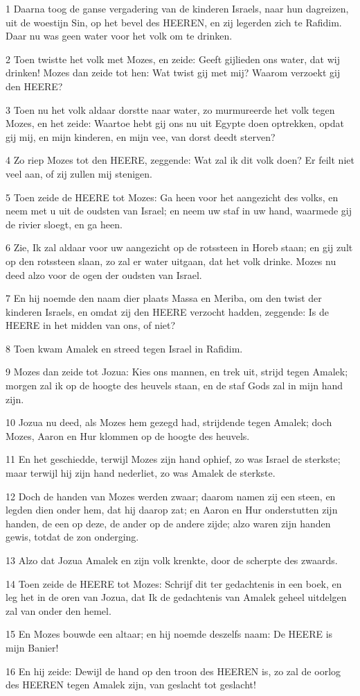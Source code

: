 \par 1 Daarna toog de ganse vergadering van de kinderen Israels, naar hun dagreizen, uit de woestijn Sin, op het bevel des HEEREN, en zij legerden zich te Rafidim. Daar nu was geen water voor het volk om te drinken.
\par 2 Toen twistte het volk met Mozes, en zeide: Geeft gijlieden ons water, dat wij drinken! Mozes dan zeide tot hen: Wat twist gij met mij? Waarom verzoekt gij den HEERE?
\par 3 Toen nu het volk aldaar dorstte naar water, zo murmureerde het volk tegen Mozes, en het zeide: Waartoe hebt gij ons nu uit Egypte doen optrekken, opdat gij mij, en mijn kinderen, en mijn vee, van dorst deedt sterven?
\par 4 Zo riep Mozes tot den HEERE, zeggende: Wat zal ik dit volk doen? Er feilt niet veel aan, of zij zullen mij stenigen.
\par 5 Toen zeide de HEERE tot Mozes: Ga heen voor het aangezicht des volks, en neem met u uit de oudsten van Israel; en neem uw staf in uw hand, waarmede gij de rivier sloegt, en ga heen.
\par 6 Zie, Ik zal aldaar voor uw aangezicht op de rotssteen in Horeb staan; en gij zult op den rotssteen slaan, zo zal er water uitgaan, dat het volk drinke. Mozes nu deed alzo voor de ogen der oudsten van Israel.
\par 7 En hij noemde den naam dier plaats Massa en Meriba, om den twist der kinderen Israels, en omdat zij den HEERE verzocht hadden, zeggende: Is de HEERE in het midden van ons, of niet?
\par 8 Toen kwam Amalek en streed tegen Israel in Rafidim.
\par 9 Mozes dan zeide tot Jozua: Kies ons mannen, en trek uit, strijd tegen Amalek; morgen zal ik op de hoogte des heuvels staan, en de staf Gods zal in mijn hand zijn.
\par 10 Jozua nu deed, als Mozes hem gezegd had, strijdende tegen Amalek; doch Mozes, Aaron en Hur klommen op de hoogte des heuvels.
\par 11 En het geschiedde, terwijl Mozes zijn hand ophief, zo was Israel de sterkste; maar terwijl hij zijn hand nederliet, zo was Amalek de sterkste.
\par 12 Doch de handen van Mozes werden zwaar; daarom namen zij een steen, en legden dien onder hem, dat hij daarop zat; en Aaron en Hur onderstutten zijn handen, de een op deze, de ander op de andere zijde; alzo waren zijn handen gewis, totdat de zon onderging.
\par 13 Alzo dat Jozua Amalek en zijn volk krenkte, door de scherpte des zwaards.
\par 14 Toen zeide de HEERE tot Mozes: Schrijf dit ter gedachtenis in een boek, en leg het in de oren van Jozua, dat Ik de gedachtenis van Amalek geheel uitdelgen zal van onder den hemel.
\par 15 En Mozes bouwde een altaar; en hij noemde deszelfs naam: De HEERE is mijn Banier!
\par 16 En hij zeide: Dewijl de hand op den troon des HEEREN is, zo zal de oorlog des HEEREN tegen Amalek zijn, van geslacht tot geslacht!

